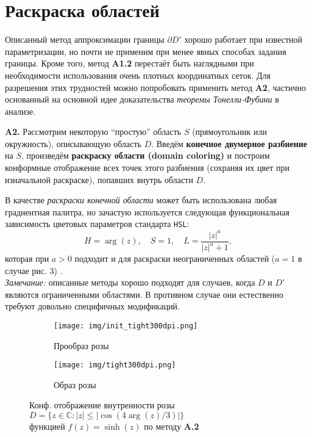 \documentclass{article}
\theoremstyle{definition}
\newcommand{\q}[1]{``#1''}
\begin{document}
\section{Раскраска областей}
Описанный метод аппроксимации границы $\partial D'$ хорошо работает при известной параметризации, но почти не применим при менее явных способах задания границы. Кроме того, метод \textbf{A1.2} перестаёт быть наглядными при необходимости использования очень плотных координатных сеток. Для разрешения этих трудностей можно попробовать применить метод \textbf{A2}, частично основанный на основной идее доказательства \textit{теоремы Тонелли-Фубини} в анализе.
\begin{displayquote}
\textbf{A2.} Рассмотрим некоторую \q{простую} область $S$ (прямоугольник или окружность), описывающую область $D$. Введём \textbf{конечное двумерное разбиение} на $S$, произведём \textbf{раскраску области (domain coloring)} и построим конформные отображение всех точек этого разбиения (сохраняя их цвет при изначальной раскраске), попавших внутрь области $D$. 
\end{displayquote}
В качестве \textit{раскраски конечной области} может быть использована любая градиентная палитра, но зачастую используется следующая функциональная зависимость цветовых параметров стандарта \verb_HSL_:
\begin{equation*}
H = \arg(z), \quad S = 1, \quad L = \dfrac{|z|^a}{|z|^a + 1},
\end{equation*}
которая при $a>0$ подходит и для раскраски неограниченных областей ($a=1$ в случае рис. 3) \cite{Eng}\cite{online}. \\
\textit{Замечание:} описанные методы хорошо подходят для случаев, когда $D$ и $D'$ являются ограниченными областями. В противном случае они естественно требуют довольно специфичных модификаций.
\begin{figure}[p]
    \centering
    \begin{subfigure}{0.65\textwidth}
        \texttt{[image: img/init\_tight300dpi.png]}
        \caption{\; Прообраз розы}
    \end{subfigure}
    \begin{subfigure}{0.65\textwidth}
    \vspace*{0.6cm}
        \texttt{[image: img/tight300dpi.png]}
        \caption{\; Образ розы}
    \end{subfigure}
    \vspace*{0.25cm}
    \caption{ \centering Конф. отображение внутренности розы $D=\bigl\{ z\in \mathbb{C}:|z|\leq|\cos(4\arg(z)/3)|\bigr\}$ \\ функцией $f(z)=\sinh(z)$ по методу \textbf{A.2}}
\end{figure}
\newpage
\end{document}
